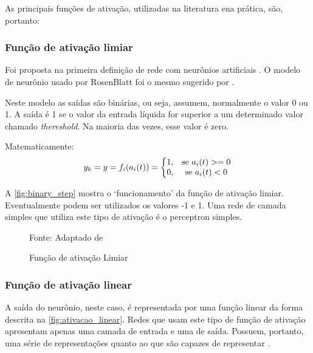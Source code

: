 As principais funções de ativação, utilizadas na literatura ena prática, são, portanto:

\subsubsection{Função de ativação limiar}\label{ativacao:limiar}
Foi proposta na primeira definição de rede com neurônios artificiais \cite{rosenblatt_perceptron:_1958}. O modelo de neurônio usado por RosenBlatt foi o mesmo sugerido por . 

Neste modelo as saídas são binárias, ou seja, assumem, normalmente o valor 0 ou 1. A saída é 1 se o valor da entrada líquida for superior a um determinado valor chamado \textit{thereshold}. Na maioria das vezes, esse valor é zero.

Matematicamente:
\begin{equation}\label{eq:limiar}
	y_k = y = f_i(a_i(t)) = \left \{ 
	\begin{matrix} 1\textrm{,} & \mbox{\textrm{se }}a_i(t) >= 0 \\
	0\mbox{\textrm{,}} & \mbox{\textrm{se }}a_i(t) < 0 \end{matrix} 
	\right.
\end{equation}

A \autoref{fig:binary_step} mostra o `funcionamento' da função de ativação limiar. Eventualmente podem ser utilizados os valores -1 e 1. Uma rede de camada simples que utiliza este tipo de ativação é o perceptron simples.

\begin{figure}[h!]
	\centering
	\caption{Função de ativação Limiar}

	{\scriptsize 	Fonte: Adaptado de }
	\label{fig:binary_step}
\end{figure}

\subsubsection{Função de ativação linear}\label{ativacao:linear}
A saída do neurônio, neste caso, é representada por uma função linear da forma descrita na \autoref{fig:ativacao_linear}. Redes que usam este tipo de função de ativação apresentam apenas uma camada de entrada e uma de saída. Possuem, portanto, uma série de representações quanto ao que são capazes de representar \cite{lima_ia_2016}.

